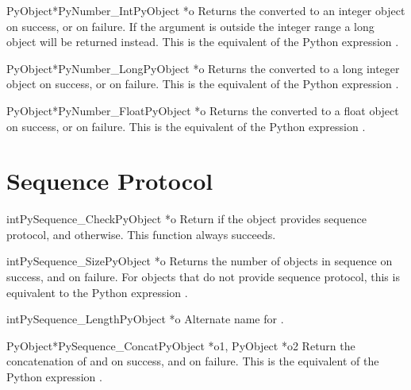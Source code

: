 \begin{cfuncdesc}{PyObject*}{PyNumber_Int}{PyObject *o}
  Returns the  converted to an integer object on success, or
  \NULL{} on failure.  If the argument is outside the integer range
  a long object will be returned instead. This is the equivalent
  of the Python expression .
\end{cfuncdesc}

\begin{cfuncdesc}{PyObject*}{PyNumber_Long}{PyObject *o}
  Returns the  converted to a long integer object on success,
  or \NULL{} on failure.  This is the equivalent of the Python
  expression .
\end{cfuncdesc}

\begin{cfuncdesc}{PyObject*}{PyNumber_Float}{PyObject *o}
  Returns the  converted to a float object on success, or
  \NULL{} on failure.  This is the equivalent of the Python expression
  .
\end{cfuncdesc}


\section{Sequence Protocol \label{sequence}}

\begin{cfuncdesc}{int}{PySequence_Check}{PyObject *o}
  Return  if the object provides sequence protocol, and
   otherwise.  This function always succeeds.
\end{cfuncdesc}

\begin{cfuncdesc}{int}{PySequence_Size}{PyObject *o}
  Returns the number of objects in sequence  on success, and
   on failure.  For objects that do not provide sequence
  protocol, this is equivalent to the Python expression
  .
\end{cfuncdesc}

\begin{cfuncdesc}{int}{PySequence_Length}{PyObject *o}
  Alternate name for .
\end{cfuncdesc}

\begin{cfuncdesc}{PyObject*}{PySequence_Concat}{PyObject *o1, PyObject *o2}
  Return the concatenation of  and  on success, and
  \NULL{} on failure.   This is the equivalent of the Python
  expression .
\end{cfuncdesc}


